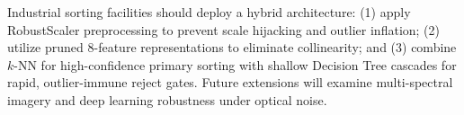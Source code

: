 \documentclass[11pt,a4paper]{article}
\begin{document}
Industrial sorting facilities should deploy a hybrid architecture: (1) apply RobustScaler preprocessing to prevent scale hijacking and outlier inflation; (2) utilize pruned 8-feature representations to eliminate collinearity; and (3) combine $k$-NN for high-confidence primary sorting with shallow Decision Tree cascades for rapid, outlier-immune reject gates. Future extensions will examine multi-spectral imagery and deep learning robustness under optical noise.

\newpage


\end{document}

